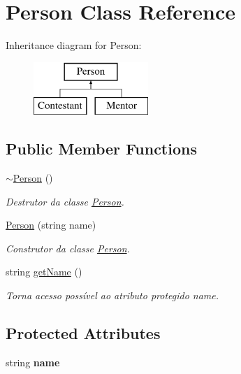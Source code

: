 \hypertarget{class_person}{}\section{Person Class Reference}
\label{class_person}
Inheritance diagram for Person\+:\begin{figure}[H]
\begin{center}
\leavevmode
\includegraphics[height=2.000000cm]{class_person}
\end{center}
\end{figure}
\subsection*{Public Member Functions}
\begin{DoxyCompactItemize}
\item 
\hypertarget{class_person_a700ffd693321c5fe6880262acf43d4da}{}\label{class_person_a700ffd693321c5fe6880262acf43d4da} 
\hyperlink{class_person_a700ffd693321c5fe6880262acf43d4da}{$\sim$\+Person} ()
\begin{DoxyCompactList}\small\item\em Destrutor da classe \hyperlink{class_person}{Person}. \end{DoxyCompactList}\item 
\hyperlink{class_person_aba0adcb7be258cfdda603c6261a61985}{Person} (string name)
\begin{DoxyCompactList}\small\item\em Construtor da classe \hyperlink{class_person}{Person}. \end{DoxyCompactList}\item 
string \hyperlink{class_person_a1f98501a519ee5d44f53a6d6423ae67b}{get\+Name} ()
\begin{DoxyCompactList}\small\item\em Torna acesso possível ao atributo protegido name. \end{DoxyCompactList}\end{DoxyCompactItemize}
\subsection*{Protected Attributes}
\begin{DoxyCompactItemize}
\item 
\hypertarget{class_person_a669b64897b4d823a27bb5866368d4dfa}{}\label{class_person_a669b64897b4d823a27bb5866368d4dfa} 
string {\bfseries name}
\end{DoxyCompactItemize}


